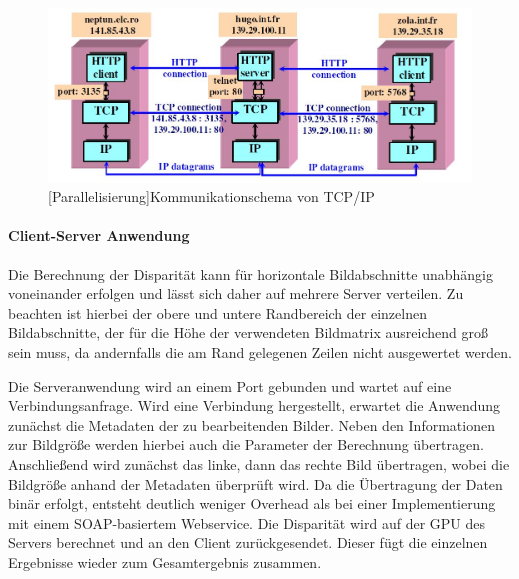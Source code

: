\documentclass[times, 10pt,twocolumn]{article}
\begin{document}
 \begin{figure}[!ht]
	\centering
	\includegraphics[width=0.9\linewidth]{image/ip-tcp.jpg}
	[Parallelisierung]{Kommunikationschema von TCP/IP \cite{Werner.2015}}
	\label{fig:tcpip}
\end{figure}

\paragraph{Client-Server Anwendung}
Die Berechnung der Disparität kann für horizontale Bildabschnitte unabhängig voneinander erfolgen und lässt sich daher auf mehrere Server verteilen. Zu beachten ist hierbei der obere und untere Randbereich der einzelnen Bildabschnitte, der für die Höhe der verwendeten Bildmatrix ausreichend groß sein muss, da andernfalls die am Rand gelegenen Zeilen nicht ausgewertet werden.

Die Serveranwendung wird an einem Port gebunden und wartet auf eine Verbindungsanfrage. Wird eine Verbindung hergestellt, erwartet die Anwendung zunächst die Metadaten der zu bearbeitenden Bilder. Neben den Informationen zur Bildgröße werden hierbei auch die Parameter der Berechnung übertragen. Anschließend wird zunächst das linke, dann das rechte Bild übertragen, wobei die Bildgröße anhand der Metadaten überprüft wird. Da die Übertragung der Daten binär erfolgt, entsteht deutlich weniger Overhead als bei einer Implementierung mit einem SOAP-basiertem Webservice. Die Disparität wird auf der GPU des Servers berechnet und an den Client zurückgesendet. Dieser fügt die einzelnen Ergebnisse wieder zum Gesamtergebnis zusammen.


\end{document}

